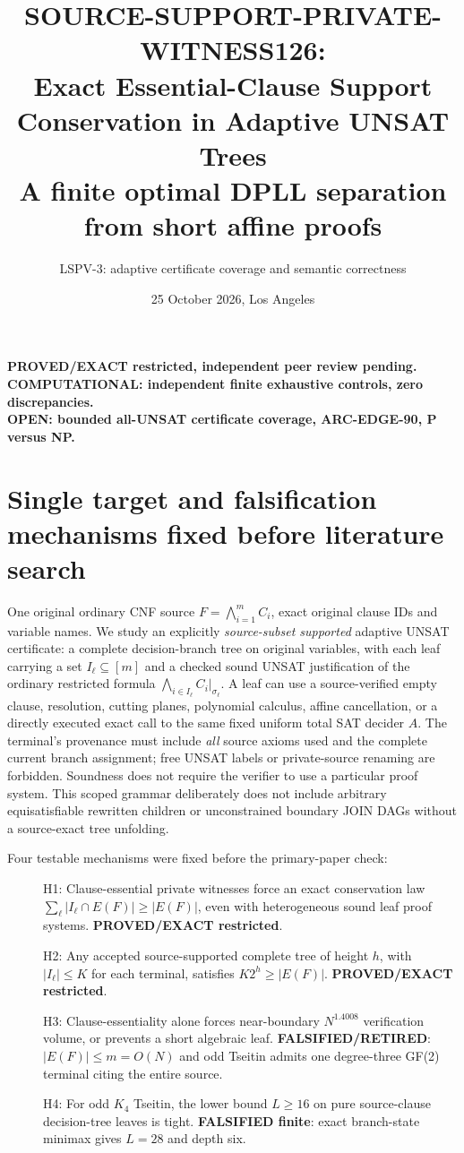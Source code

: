 \documentclass[11pt]{article}
\title{SOURCE-SUPPORT-PRIVATE-WITNESS126:\\
Exact Essential-Clause Support Conservation in Adaptive UNSAT Trees\\
\large A finite optimal DPLL separation from short affine proofs}
\author{LSPV-3: adaptive certificate coverage and semantic correctness}
\date{25 October 2026, Los Angeles}
\begin{document}
\maketitle
\begin{center}
\textbf{PROVED/EXACT restricted, independent peer review pending.}\\
\textbf{COMPUTATIONAL: independent finite exhaustive controls, zero discrepancies.}\\
\textbf{OPEN: bounded all-UNSAT certificate coverage, ARC-EDGE-90, P versus NP.}
\end{center}

\section{Single target and falsification mechanisms fixed before literature search}
One original ordinary CNF source $F=\bigwedge_{i=1}^{m}C_i$, exact original clause IDs and variable names. We study an explicitly \emph{source-subset supported} adaptive UNSAT certificate: a complete decision-branch tree on original variables, with each leaf carrying a set $I_\ell\subseteq[m]$ and a checked sound UNSAT justification of the ordinary restricted formula $\bigwedge_{i\in I_\ell}C_i|_{\sigma_\ell}$. A leaf can use a source-verified empty clause, resolution, cutting planes, polynomial calculus, affine cancellation, or a directly executed exact call to the same fixed uniform total SAT decider $A$. The terminal's provenance must include \emph{all} source axioms used and the complete current branch assignment; free UNSAT labels or private-source renaming are forbidden. Soundness does not require the verifier to use a particular proof system. This scoped grammar deliberately does not include arbitrary equisatisfiable rewritten children or unconstrained boundary JOIN DAGs without a source-exact tree unfolding.

Four testable mechanisms were fixed before the primary-paper check:
\begin{description}
\item[] H1: Clause-essential private witnesses force an exact conservation law $\sum_\ell|I_\ell\cap E(F)|\ge|E(F)|$, even with heterogeneous sound leaf proof systems. \textbf{PROVED/EXACT restricted}.
\item[] H2: Any accepted source-supported complete tree of height $h$, with $|I_\ell|\le K$ for each terminal, satisfies $K2^h\ge|E(F)|$. \textbf{PROVED/EXACT restricted}.
\item[] H3: Clause-essentiality alone forces near-boundary $N^{1.4008}$ verification volume, or prevents a short algebraic leaf. \textbf{FALSIFIED/RETIRED}: $|E(F)|\le m=O(N)$ and odd Tseitin admits one degree-three GF(2) terminal citing the entire source.
\item[] H4: For odd $K_4$ Tseitin, the lower bound $L\ge16$ on pure source-clause decision-tree leaves is tight. \textbf{FALSIFIED finite}: exact branch-state minimax gives $L=28$ and depth six.
\end{description}
\end{document}
